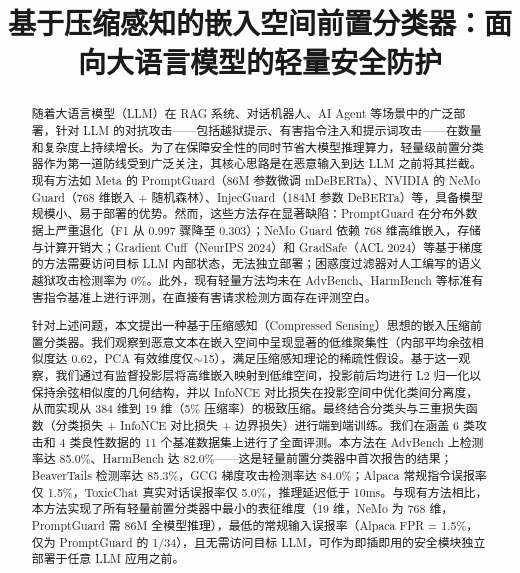 \documentclass[conference]{IEEEtran}
\begin{document}
\title{基于压缩感知的嵌入空间前置分类器：面向大语言模型的轻量安全防护}

\author{
}

\maketitle

\begin{abstract}
随着大语言模型（LLM）在 RAG 系统、对话机器人、AI Agent 等场景中的广泛部署，针对 LLM 的对抗攻击——包括越狱提示、有害指令注入和提示词攻击——在数量和复杂度上持续增长。为了在保障安全性的同时节省大模型推理算力，轻量级前置分类器作为第一道防线受到广泛关注，其核心思路是在恶意输入到达 LLM 之前将其拦截。现有方法如 Meta 的 PromptGuard（86M 参数微调 mDeBERTa）、NVIDIA 的 NeMo Guard（768 维嵌入 + 随机森林）、InjecGuard（184M 参数 DeBERTa）等，具备模型规模小、易于部署的优势。然而，这些方法存在显著缺陷：PromptGuard 在分布外数据上严重退化（F1 从 0.997 骤降至 0.303）；NeMo Guard 依赖 768 维高维嵌入，存储与计算开销大；Gradient Cuff（NeurIPS 2024）和 GradSafe（ACL 2024）等基于梯度的方法需要访问目标 LLM 内部状态，无法独立部署；困惑度过滤器对人工编写的语义越狱攻击检测率为 0\%。此外，现有轻量方法均未在 AdvBench、HarmBench 等标准有害指令基准上进行评测，在直接有害请求检测方面存在评测空白。

针对上述问题，本文提出一种基于压缩感知（Compressed Sensing）思想的嵌入压缩前置分类器。我们观察到恶意文本在嵌入空间中呈现显著的低维聚集性（内部平均余弦相似度达 0.62，PCA 有效维度仅$\sim$15），满足压缩感知理论的稀疏性假设。基于这一观察，我们通过有监督投影层将高维嵌入映射到低维空间，投影前后均进行 L2 归一化以保持余弦相似度的几何结构，并以 InfoNCE 对比损失在投影空间中优化类间分离度，从而实现从 384 维到 19 维（5\% 压缩率）的极致压缩。最终结合分类头与三重损失函数（分类损失 + InfoNCE 对比损失 + 边界损失）进行端到端训练。我们在涵盖 6 类攻击和 4 类良性数据的 11 个基准数据集上进行了全面评测。本方法在 AdvBench 上检测率达 85.0\%、HarmBench 达 82.0\%——这是轻量前置分类器中首次报告的结果；BeaverTails 检测率达 85.3\%，GCG 梯度攻击检测率达 84.0\%；Alpaca 常规指令误报率仅 1.5\%，ToxicChat 真实对话误报率仅 5.0\%，推理延迟低于 10ms。与现有方法相比，本方法实现了所有轻量前置分类器中最小的表征维度（19 维，NeMo 为 768 维，PromptGuard 需 86M 全模型推理），最低的常规输入误报率（Alpaca FPR = 1.5\%，仅为 PromptGuard 的 1/34），且无需访问目标 LLM，可作为即插即用的安全模块独立部署于任意 LLM 应用之前。
\end{abstract}
\end{document}
